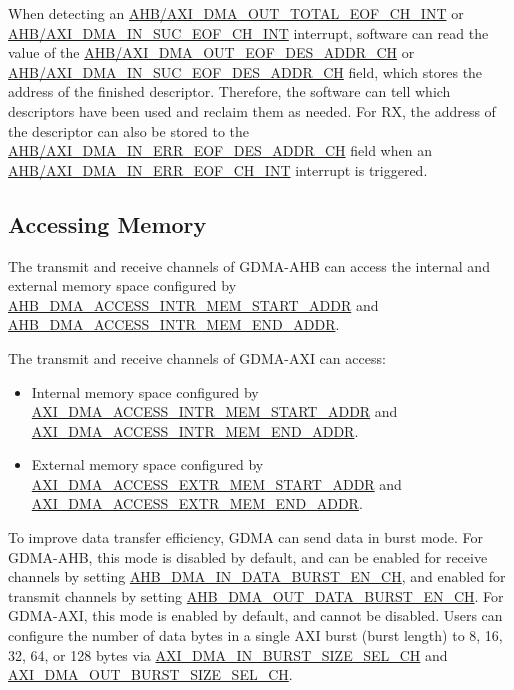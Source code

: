 \documentclass[main\_\_EN.tex]{subfiles}
\begin{document}
When detecting an \hyperref[int:GDMAOUTTOTALEOFINT]{AHB/AXI\_DMA\_OUT\_TOTAL\_EOF\_CH\_INT} or \hyperref[int:GDMAINSUCEOFINT]{AHB/AXI\_DMA\_IN\_SUC\_EOF\_CH\_INT} interrupt, software can read the value of the \hyperref[fielddesc:AHBDMAOUTEOFDESADDRCHN]{AHB/AXI\_DMA\_OUT\_EOF\_DES\_ADDR\_CH} or \hyperref[fielddesc:AHBDMAINSUCEOFDESADDRCHN]{AHB/AXI\_DMA\_IN\_SUC\_EOF\_DES\_ADDR\_CH} field, which stores the address of the finished descriptor. Therefore, the software can tell which descriptors have been used and reclaim them as needed. For RX, the address of the descriptor can also be stored to the \hyperref[fielddesc:AHBDMAINERREOFDESADDRCHN]{AHB/AXI\_DMA\_IN\_ERR\_EOF\_DES\_ADDR\_CH} field when an \hyperref[int:GDMAINERREOFINT]{AHB/AXI\_DMA\_IN\_ERR\_EOF\_CH\_INT} interrupt is triggered.


\subsection{Accessing Memory}\label{sec:dma-access-inter-ram}

The transmit and receive channels of GDMA-AHB can access the internal and external memory space configured by \hyperref[fielddesc:AHBDMAACCESSINTRMEMSTARTADDR]{AHB\_DMA\_ACCESS\_INTR\_MEM\_START\_ADDR} and \hyperref[fielddesc:AHBDMAACCESSINTRMEMENDADDR]{AHB\_DMA\_ACCESS\_INTR\_MEM\_END\_ADDR}.

The transmit and receive channels of GDMA-AXI can access:
\begin{itemize}
    \item Internal memory space configured by \hyperref[fielddesc:AXIDMAACCESSINTRMEMSTARTADDR]{AXI\_DMA\_ACCESS\_INTR\_MEM\_START\_ADDR} and \hyperref[fielddesc:AXIDMAACCESSINTRMEMENDADDR]{AXI\_DMA\_ACCESS\_INTR\_MEM\_END\_ADDR}.
    \item External memory space configured by \hyperref[fielddesc:AXIDMAACCESSEXTRMEMSTARTADDR]{AXI\_DMA\_ACCESS\_EXTR\_MEM\_START\_ADDR} and \hyperref[fielddesc:AXIDMAACCESSEXTRMEMENDADDR]{AXI\_DMA\_ACCESS\_EXTR\_MEM\_END\_ADDR}.
\end{itemize}

To improve data transfer efficiency, GDMA can send data in burst mode. For GDMA-AHB, this mode is disabled by default, and can be enabled for receive channels by setting \hyperref[fielddesc:AHBDMAINDATABURSTENCHN]{AHB\_DMA\_IN\_DATA\_BURST\_EN\_CH}, and enabled for transmit channels by setting \hyperref[fielddesc:AHBDMAOUTDATABURSTENCHN]{AHB\_DMA\_OUT\_DATA\_BURST\_EN\_CH}. For GDMA-AXI, this mode is enabled by default, and cannot be disabled. Users can configure the number of data bytes in a single AXI burst (burst length) to 8, 16, 32, 64, or 128 bytes via \hyperref[fielddesc:AXIDMAINBURSTSIZESELCHN]{AXI\_DMA\_IN\_BURST\_SIZE\_SEL\_CH} and \hyperref[fielddesc:AXIDMAOUTBURSTSIZESELCHN]{AXI\_DMA\_OUT\_BURST\_SIZE\_SEL\_CH}.
\end{document}
